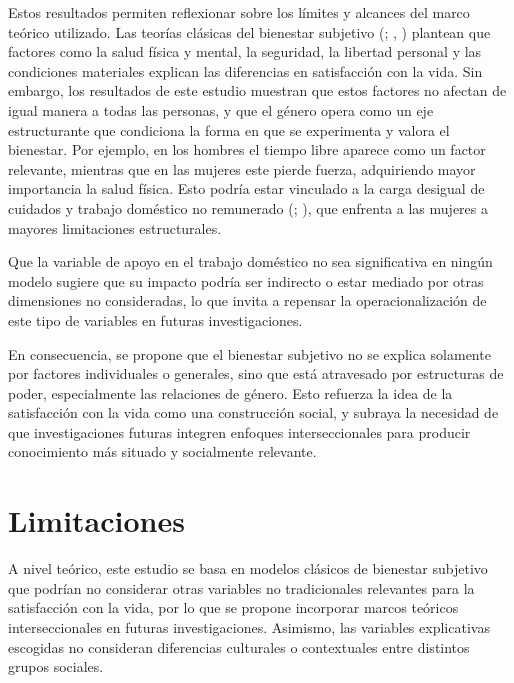 \documentclass[
  spanish,
  a4paper,
  oneside]{scrbook}
\begin{document}
Estos resultados permiten reflexionar sobre los límites y alcances del
marco teórico utilizado. Las teorías clásicas del bienestar subjetivo
(;
,
) plantean que factores como la salud
física y mental, la seguridad, la libertad personal y las condiciones
materiales explican las diferencias en satisfacción con la vida. Sin
embargo, los resultados de este estudio muestran que estos factores no
afectan de igual manera a todas las personas, y que el género opera como
un eje estructurante que condiciona la forma en que se experimenta y
valora el bienestar. Por ejemplo, en los hombres el tiempo libre aparece
como un factor relevante, mientras que en las mujeres este pierde
fuerza, adquiriendo mayor importancia la salud física. Esto podría estar
vinculado a la carga desigual de cuidados y trabajo doméstico no
remunerado (;
), que enfrenta a las mujeres
a mayores limitaciones estructurales.

Que la variable de apoyo en el trabajo doméstico no sea significativa en
ningún modelo sugiere que su impacto podría ser indirecto o estar
mediado por otras dimensiones no consideradas, lo que invita a repensar
la operacionalización de este tipo de variables en futuras
investigaciones.

En consecuencia, se propone que el bienestar subjetivo no se explica
solamente por factores individuales o generales, sino que está
atravesado por estructuras de poder, especialmente las relaciones de
género. Esto refuerza la idea de la satisfacción con la vida como una
construcción social, y subraya la necesidad de que investigaciones
futuras integren enfoques interseccionales para producir conocimiento
más situado y socialmente relevante.

\section{Limitaciones}\label{limitaciones}

A nivel teórico, este estudio se basa en modelos clásicos de bienestar
subjetivo que podrían no considerar otras variables no tradicionales
relevantes para la satisfacción con la vida, por lo que se propone
incorporar marcos teóricos interseccionales en futuras investigaciones.
Asimismo, las variables explicativas escogidas no consideran diferencias
culturales o contextuales entre distintos grupos sociales.
\end{document}
